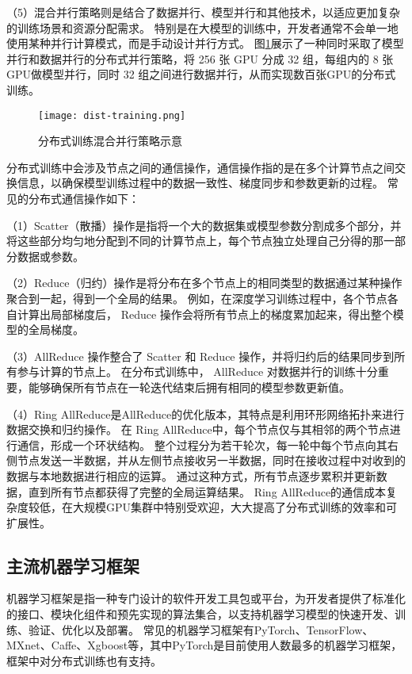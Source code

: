（5）混合并行策略则是结合了数据并行、模型并行和其他技术，以适应更加复杂的训练场景和资源分配需求。
特别是在大模型的训练中，开发者通常不会单一地使用某种并行计算模式，而是手动设计并行方式。
图\ref{fig:disttraining}展示了一种同时采取了模型并行和数据并行的分布式并行策略，将 256 张 GPU 分成 32 组，每组内的 8 张GPU做模型并行，同时 32 组之间进行数据并行，从而实现数百张GPU的分布式训练。

\begin{figure}
  \centering
  \texttt{[image: dist-training.png]}
  \caption{分布式训练混合并行策略示意}
  \label{fig:disttraining}
\end{figure}

分布式训练中会涉及节点之间的通信操作，通信操作指的是在多个计算节点之间交换信息，以确保模型训练过程中的数据一致性、梯度同步和参数更新的过程。
常见的分布式通信操作如下：

（1）Scatter（散播）操作是指将一个大的数据集或模型参数分割成多个部分，并将这些部分均匀地分配到不同的计算节点上，每个节点独立处理自己分得的那一部分数据或参数。

（2）Reduce（归约）操作是将分布在多个节点上的相同类型的数据通过某种操作聚合到一起，得到一个全局的结果。
例如，在深度学习训练过程中，各个节点各自计算出局部梯度后， Reduce 操作会将所有节点上的梯度累加起来，得出整个模型的全局梯度。

（3）AllReduce 操作整合了 Scatter 和 Reduce 操作，并将归约后的结果同步到所有参与计算的节点上。
在分布式训练中， AllReduce 对数据并行的训练十分重要，能够确保所有节点在一轮迭代结束后拥有相同的模型参数更新值。

（4）Ring AllReduce是AllReduce的优化版本，其特点是利用环形网络拓扑来进行数据交换和归约操作。
在 Ring AllReduce中，每个节点仅与其相邻的两个节点进行通信，形成一个环状结构。
整个过程分为若干轮次，每一轮中每个节点向其右侧节点发送一半数据，并从左侧节点接收另一半数据，同时在接收过程中对收到的数据与本地数据进行相应的运算。
通过这种方式，所有节点逐步累积并更新数据，直到所有节点都获得了完整的全局运算结果。
Ring AllReduce的通信成本复杂度较低，在大规模GPU集群中特别受欢迎，大大提高了分布式训练的效率和可扩展性。

\subsection{主流机器学习框架}

机器学习框架是指一种专门设计的软件开发工具包或平台，为开发者提供了标准化的接口、模块化组件和预先实现的算法集合，以支持机器学习模型的快速开发、训练、验证、优化以及部署。
常见的机器学习框架有PyTorch、TensorFlow、MXnet、Caffe、Xgboost等，其中PyTorch是目前使用人数最多的机器学习框架，框架中对分布式训练也有支持。

